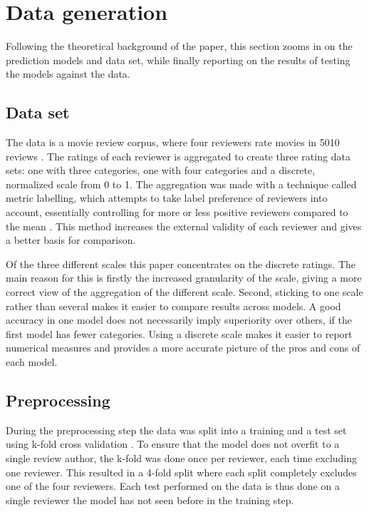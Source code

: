 \documentclass[a4paper]{article}
\begin{document}
\section{Data generation}
Following the theoretical background of the paper, this section zooms in on
the prediction models and data set, while finally reporting on the results of
testing the models against the data.

\subsection{Data set}
\label{sec:dataset}
The data is a movie review corpus, where four reviewers rate movies in 5010
reviews \citep{PangLee2005}. The ratings of each reviewer is aggregated
to create three rating data sets: one with three categories,
one with four categories and a discrete, normalized scale from 0 to 1. The aggregation
was made with a technique called metric labelling, which attempts to take
label preference of reviewers into account, essentially controlling for more
or less positive reviewers compared to the mean \citep{PangLee2005}. This method
increases the external validity of each reviewer and gives a better basis
for comparison.

Of the three different scales this paper concentrates on the discrete ratings.
The main reason for this is firstly the increased granularity of the scale, giving a
more correct view of the aggregation of the different scale. Second, sticking
to one scale rather than several makes it easier to compare results across
models. A good accuracy in one model does not necessarily imply superiority
over others, if the first model has fewer categories. Using a discrete scale
makes it easier to report numerical measures and provides a more accurate
picture of the pros and cons of each model.

\subsection{Preprocessing}
During the preprocessing step the data was split into a training and a test
set using k-fold cross validation \citep{Russell2009}. To ensure that the
model does not overfit to a single review author, the k-fold was done once
per reviewer, each time excluding one reviewer. This resulted in a 4-fold split
where each split completely excludes one of the four reviewers. Each test
performed on the data is thus done on a single reviewer the model has not
seen before in the training step.
\end{document}
